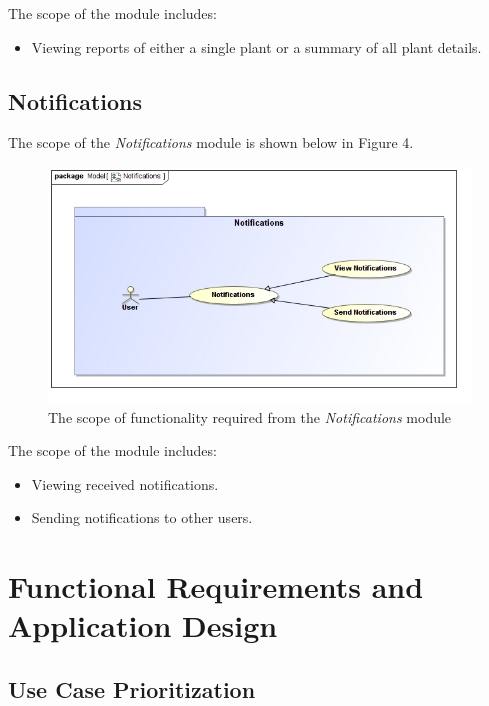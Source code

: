 \documentclass{article}
\begin{document}
		The scope of the \emph{} module includes:
		
		\begin{itemize}
			\item Viewing reports of either a single plant or a summary of all plant details.
		\end{itemize}
		
	\pagebreak
	\subsection{Notifications}
		The scope of the \emph{Notifications} module is shown below in Figure 4.
		
		\begin{figure}[H]
			\centering
			\includegraphics[width=\textwidth]{../vision-scope-architectural-req-and-initial-architecture-design/Notifications.jpg}
			\caption{The scope of functionality required from the \emph{Notifications} module}
		\end{figure}
		
		The scope of the \emph{} module includes:
		
		\begin{itemize}
			\item Viewing received notifications.
			\item Sending notifications to other users.
		\end{itemize}

\section{Functional Requirements and Application Design}
	\subsection{Use Case Prioritization}
\end{document}
